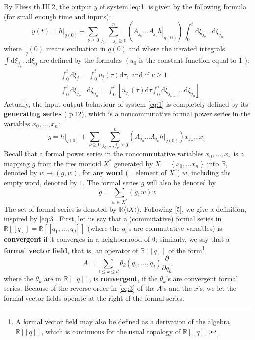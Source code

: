 \documentclass[a4paper,12pt]{article}
\newcommand{\R}{\mathbb{R}}
\newcommand{\Rxx}{\R\langle\langle X\rangle\rangle}
\newcommand{\dd}{\mathrm{d}}
\begin{document}
By Fliess \cite{4} th.III.2, the output $y$ of system \eqref{eq:1} is given by the following formula (for small enough time and inputs):
\begin{equation} \label{eq:2}
	y(t)=\left.h\right|_{q(0)}+\sum_{\nu \geq 0} \sum_{j_0, \ldots, j_\nu \geq 0}^n\left(\left.A_{j_0} \ldots A_{j_\nu} h\right|_{q(0)}\right) \int_0^t \dd \xi_{j_\nu} \ldots \dd \xi_{j_0}
\end{equation}
where $\rvert_q(0)$ means evaluation in $q(0)$ and where the iterated integrals $\int \dd \xi_{j_v} \ldots \dd \xi_0$ are defined by the formulas $\left(u_0\right.$ is the constant function equal to 1 ):
\begin{equation*}
	\begin{aligned}
		& \int_0^t \dd \xi_j=\int_0^t u_j(\tau) \dd \tau, \text { and if } \nu \geq 1 \\
		& \int_0^t \dd \xi_{j_\nu} \ldots \dd \xi_{j_0}=\int_0^t\left[u_{j_\nu}(\tau) \dd  \tau \int_0^\tau \dd \xi_{j_{\nu-1}} \ldots \dd  \xi_{j_0}\right]
	\end{aligned}
\end{equation*}
Actually, the input-output behaviour of system \eqref{eq:1} is completely defined by its \textbf{generating series} (\cite{4} p.12), which is a noncommutative formal power series in the variables $x_0, \ldots, x_n$:
\begin{equation} \label{eq:3}
	{g}=\left.{h}\right|_{{q}(0)}+\sum_{\nu \geq 0} \sum_{j_0, \ldots, j_\nu \geq 0}^{{n}}\left({A}_{j_0} \ldots {A}_{j_\nu} {h}\rvert_{{q}(0)}\right) {x}_{{j}_\nu} \ldots {x}_{j_0}
\end{equation}
Recall that a formal power series in the noncommutative variables ${x}_0, \ldots, {x}_{{n}}$ is a mapping ${g}$ from the free monoid $X^*$ generated by ${X}=\left\{{x}_0, \ldots x_n\right\}$ into $\R$, denoted by ${w} \rightarrow({g}, {w})$, for any \textbf{word} (= element of $X^*$) ${w}$, including the empty word, denoted by $1$. The formal series $g$ will also be denoted by
\begin{equation*}
	g=\sum_{w \in {X}^*}(g, {w}) {w}
\end{equation*}
The set of formal series is denoted by $\Rxx$. Following [5], we give a definition, inspired by \eqref{eq:3}. First, let us say that a (commutative) formal series in $\R[[q]]=\R[[q_1, \ldots, q_d]]$ (where the $q_i$'s are commutative variables) is \textbf{convergent} if it converges in a neighborhood of $0$; similarly, we say that a \textbf{formal vector field}, that is, an operator of $\R[[q]]$ of the form\footnote{A formal vector field may also be defined as a derivation of the algebra $\R[[q]]$, which is continuous for the usual topology of $\R[[q]]$.}
\begin{equation*}
	A=\sum_{1 \leq k \leq d} \theta_k\left(q_1, \ldots, q_d\right) \frac{\partial}{\partial q_k}
\end{equation*}
where the $\theta_{{k}}$ are in $\R[[{q}]]$, is \textbf{convergent}, if the $\theta_{k}$'s are convergent formal series. Because of the reverse order in \eqref{eq:3} of the $A$'s and the $x$'s, we let the formal vector fields operate at the right of the formal series.
\end{document}
